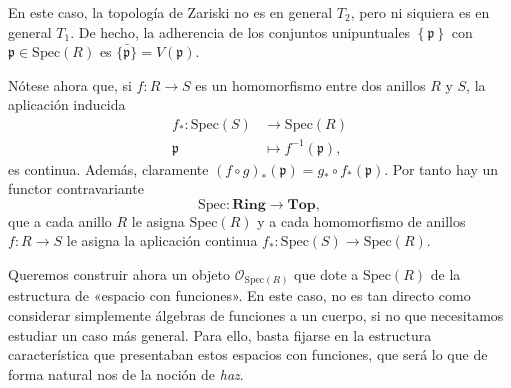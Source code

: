 \documentclass[12pt,a4paper]{article}
\theoremstyle{definition} \newtheorem{defn}[thm]{Definición}
\theoremstyle{definition} \newtheorem{ejemplo}[thm]{Ejemplo}
\theoremstyle{definition} \newtheorem{ejercicio}[thm]{Ejercicio}
\theoremstyle{remark} \newtheorem*{obs}{Observación}
\def\sp{\mathrm{Spec}}
\def\pp{\mathfrak{p}}
\def\OO{\mathscr{O}}
\begin{document}
      En este caso, la topología de Zariski no es en general $T_2$, pero ni siquiera es en general $T_1$. De hecho, la adherencia de los conjuntos unipuntuales $\left\{ \pp \right\}$ con $\pp \in \sp(R)$ es $\bar{\{\pp\}}=V(\pp)$.

      Nótese ahora que, si $f:R\rightarrow S$ es un homomorfismo entre dos anillos $R$ y $S$, la aplicación inducida
      \begin{align*}
	f_* :\sp(S)&\longrightarrow \sp(R)\\ 
	\pp &\longmapsto f^{-1}(\pp), 
	\end{align*}
	es continua. Además, claramente $(f\circ g)_*(\pp)=g_*\circ f_*(\pp)$. Por tanto hay un functor contravariante
	\begin{equation*}
	  \sp: \mathbf{Ring} \longrightarrow \mathbf{Top},
	\end{equation*}
	que a cada anillo $R$ le asigna $\sp(R)$ y a cada homomorfismo de anillos $f:R\rightarrow S$ le asigna la aplicación continua $f_*:\sp(S)\rightarrow \sp(R)$.

	Queremos construir ahora un objeto $\OO_{\sp(R)}$ que dote a $\sp(R)$ de la estructura de «espacio con funciones». En este caso, no es tan directo como considerar simplemente álgebras de funciones a un cuerpo, si no que necesitamos estudiar un caso más general. Para ello, basta fijarse en la estructura característica que presentaban estos espacios con funciones, que será lo que de forma natural nos de la noción de \emph{haz}.
\end{document}
